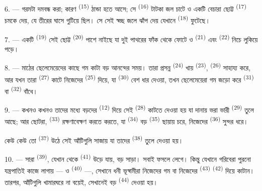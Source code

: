 6. --- গরমটা দমবন্ধ করা; কারণ  \textsuperscript{(15)} ঠান্ডা হতে
আসে; সে  \textsuperscript{(16)} টাটকা জল চাটে ও একটি বেচারা ছোট্ট
 \textsuperscript{(17)} চমকে দেয়, যে তীরের ঘাসে গুটিয়ে ছিল। সে
সেই স্বচ্ছ জলে ঝাঁপ দেয় যেখানে  \textsuperscript{(18)} ফুটেছে।

7. --- একটি  \textsuperscript{(19)} সেই ছোট্ট 
\textsuperscript{(20)} পাশে নাইছে যা দুই পাথরের ফাঁক থেকে ফোটে ও
 \textsuperscript{(21)} এবং 
\textsuperscript{(22)} নিচে লুকিয়ে পড়ে।

\VUsaut{5.0mm}
\VUsaut{3.4mm}

8. --- মাঠের ছেলেমেয়েদের কাছে গম কাটা বড় আনন্দের সময়। তারা প্রসন্ন
 \textsuperscript{(24)} খায় 
\textsuperscript{(23)},  \textsuperscript{(26)} সাহায্য করে,
আর যখন তারা  \textsuperscript{(27)} কাটে নিজেদের 
\textsuperscript{(25)} দিয়ে, যা  \textsuperscript{(30)} বেশ ধার
দেওয়া, তখন ছেলেমেয়েরা গম জড়ো করে  \textsuperscript{(31)} বা
 \textsuperscript{(32)} বাঁধে।

9. --- কখনও কখনও তাদের মধ্যে বড়দের 
\textsuperscript{(12)} দিয়ে সেই  \textsuperscript{(28)}
কাটতে দেওয়া হয় যা দানায় ভরা ভারী  \textsuperscript{(29)} তুলে
আছে; আর ছোটরা,  \textsuperscript{(33)} রক্ষণাবেক্ষণ করতে করতে, যা
 \textsuperscript{(34)} বড় 
\textsuperscript{(35)} ছায়ায় চরে, নিজেদের  \textsuperscript{(36)}
সুন্দর  ধরে।

কেউ কেউ তো  \textsuperscript{(37)} উঠে সেই আঁটিগুলি সাজায় যা
তাদের  \textsuperscript{(38)} তুলে দেওয়া হয়।

10. --- সারা  \textsuperscript{(39)}, যেখান থেকে
 \textsuperscript{(41)} উড়ে যায়, বড় সাড়া। সবাই ফসলে লেগে।
কিন্তু যেখানে গরিবেরা পুরনো যন্ত্রপাতিই কাজে লাগায় ---  ও  \textsuperscript{(40)} ---, সেখানে ধনী ভূস্বামীরা
নিজেদের গম বা নিজেদের  \textsuperscript{(43)}  \textsuperscript{(42)} দিয়ে কাটান। তারপর, আঁটিগুলি খামারঘরে না বয়েই,
সেখানেই বড়  \textsuperscript{(44)} দেওয়া হয়।

